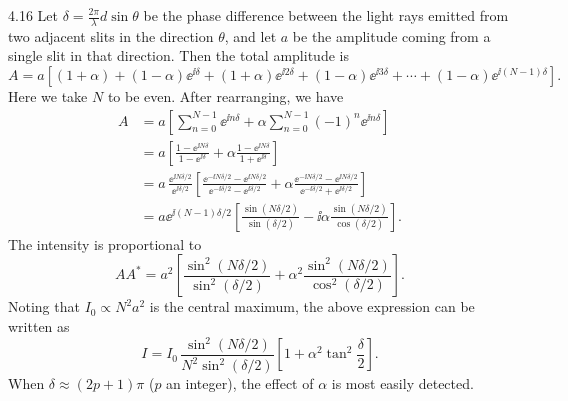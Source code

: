 \begin{solution}{4.16}
Let $\delta = \frac{2\pi}{\lambda}d\sin\theta$ be the phase difference between the light rays
emitted from two adjacent slits in the direction $\theta$, and let $a$ be the amplitude coming
from a single slit in that direction. Then the total amplitude is
\begin{equation*}
A = a\left[(1+\alpha) + (1-\alpha)\ee^{\ii\delta} + (1+\alpha)\ee^{\ii 2\delta}
    + (1-\alpha)\ee^{\ii 3\delta} + \cdots + (1-\alpha)\ee^{\ii(N-1)\delta}\right].
\end{equation*}
Here we take $N$ to be even. After rearranging, we have
\begin{align*}
A &= a\left[\sum_{n=0}^{N-1}\ee^{\ii n\delta}
     + \alpha\sum_{n=0}^{N-1}(-1)^n\ee^{\ii n\delta}\right]\\
  &= a\left[\frac{1-\ee^{\ii N\delta}}{1-\ee^{\ii\delta}}
     + \alpha\frac{1-\ee^{\ii N\delta}}{1+\ee^{\ii\delta}}\right]\\
  &= a\,\frac{\ee^{\ii N\delta/2}}{\ee^{\ii\delta/2}}
     \left[\frac{\ee^{-\ii N\delta/2}-\ee^{\ii N\delta/2}}
                {\ee^{-\ii\delta/2}-\ee^{\ii\delta/2}}
     + \alpha\frac{\ee^{-\ii N\delta/2}-\ee^{\ii N\delta/2}}
                {\ee^{-\ii\delta/2}+\ee^{\ii\delta/2}}\right]\\
  &= a\ee^{\ii(N-1)\delta/2}
     \left[\frac{\sin(N\delta/2)}{\sin(\delta/2)}
     - \ii\alpha\frac{\sin(N\delta/2)}{\cos(\delta/2)}\right].
\end{align*}
The intensity is proportional to
\begin{equation*}
AA^* = a^2\left[\frac{\sin^2(N\delta/2)}{\sin^2(\delta/2)}
      + \alpha^2\frac{\sin^2(N\delta/2)}{\cos^2(\delta/2)}\right].
\end{equation*}
Noting that $I_0\propto N^2a^2$ is the central maximum, the above expression can be written as
\begin{equation*}
I = I_0\,\frac{\sin^2(N\delta/2)}{N^2\sin^2(\delta/2)}
    \left[1+\alpha^2\tan^2\frac{\delta}{2}\right].
\end{equation*}
When $\delta \approx (2p+1)\pi$ ($p$ an integer), the effect of $\alpha$ is most easily detected.
\end{solution}

